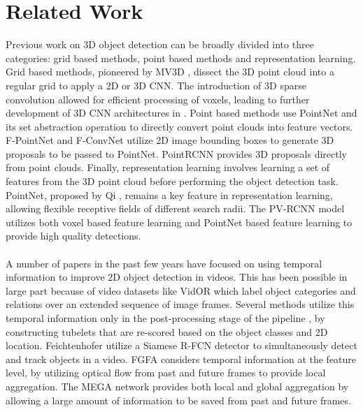 \documentclass[10pt,twocolumn,letterpaper]{article}
\begin{document}
\section{Related Work}\label{sec:related_work}
 Previous work on 3D object detection can be broadly divided into three categories: grid based methods, point based methods and representation learning. Grid based methods, pioneered by MV3D \cite{Chen2017}, dissect the 3D point cloud into a regular grid to apply a 2D or 3D CNN. The introduction of 3D sparse convolution \cite{Graham2018,Graham2017} allowed for efficient processing of voxels, leading to further development of 3D CNN architectures in \cite{9018080,Wang2019,Yan2018}. Point based methods use PointNet \cite{Charles2017,Qi2017} and its set abstraction operation to directly convert point clouds into feature vectors. F-PointNet \cite{Qi2018} and F-ConvNet \cite{Wang2019a} utilize 2D image bounding boxes to generate 3D proposals to be passed to PointNet. PointRCNN \cite{Shi2019} provides 3D proposals directly from point clouds. Finally, representation learning involves learning a set of features from the 3D point cloud before performing the object detection task. PointNet, proposed by Qi \etal \cite{Qi2017}, remains a key feature in representation learning, allowing flexible receptive fields of different search radii. The PV-RCNN \cite{Shi_2020_CVPR} model utilizes both voxel based feature learning and PointNet based feature learning to provide high quality detections.
\\\\
 A number of papers in the past few years have focused on using temporal information to improve 2D object detection in videos. This has been possible in large part because of video datasets like VidOR \cite{Shang2019,Thomee2016} which label object categories and relations over an extended sequence of image frames. Several methods utilize this temporal information only in the post-processing stage of the pipeline \cite{Han2016,Kang2017}, by constructing tubelets that are re-scored based on the object classes and 2D location. Feichtenhofer \etal \cite{Feichtenhofer2017} utilize a Siamese R-FCN detector to simultaneously detect and track objects in a video. FGFA \cite{Zhu2017} considers temporal information at the feature level, by utilizing optical flow from past and future frames to provide local aggregation. The MEGA \cite{Chen2020} network provides both local and global aggregation by allowing a large amount of information to be saved from past and future frames.
\end{document}
